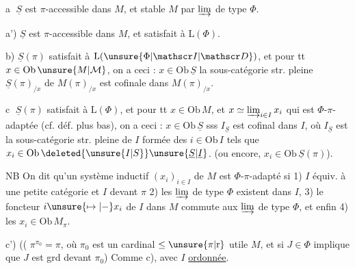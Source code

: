 \textcircled{a} $\underline S$ est $\pi$-accessible dans $M$, et stable  $M$ par $\varinjlim$ de type $\Phi$.

a') $\underline S$ est $\pi$-accessible dans $M$, et  satisfait à $\mathrm L(\Phi)$.



b) $\underline S(\pi)$ satisfait à $\mathrm L(\unsure{\Phi|\mathscr I|\mathscr D})$, et pour tt $x\in\mathrm{Ob}\,\unsure{M|\mathcal M}$, on a ceci : $x\in\mathrm{Ob}\,\underline S$  la sous-catégorie str. pleine $\underline S(\pi)_{/x}$ de $M(\pi)_{/x}$ est cofinale dans $M(\pi)_{/x}$.

\textcircled{c} $\underline S(\pi)$ satisfait à $\mathrm L(\Phi)$, et pour tt $x\in\mathrm{Ob}\,M$, et    $x\simeq\varinjlim_{i\in I}x_i$ qui est $\Phi$-$\pi$-adaptée (cf. déf. plus bas), on a ceci : $x\in\mathrm{Ob}\,\underline S$ sss $I_{\underline S}$ est cofinal dans $I$, où $I_{\underline S}$ est la sous-catégorie str. pleine de $I$ formée des $i\in\mathrm{Ob}\,I$ tels que $x_i\in\mathrm{Ob}\,\deleted{\unsure{I|S}}\unsure{\underline S|\underline I}$. (ou encore, $x_i\in\mathrm{Ob}\,\underline S(\pi)$).

NB On dit qu'un système inductif $(x_i)_{i\in I}$ de $M$ est $\Phi$-$\pi$-adapté si 1) $I$ équiv. à une petite catégorie et $I$  devant $\pi$ 2) les $\varinjlim$ de type $\Phi$ existent dans $I$, 3) le foncteur $i\unsure{\mapsto|-}x_i$ de $I$ dans $M$ commute aux $\varinjlim$ de type $\Phi$, et enfin 4) les $x_i\in\mathrm{Ob}\,M_\pi$.

c') (( $\pi^{\pi_0}=\pi$, où $\pi_0$ est un cardinal $\leq\unsure{\pi|\mathrm r}$ utile  $M$,  et si   $J\in\Phi$ implique que $J$ est grd devant $\pi_0$) Comme c), avec $I$ \uline{ordonnée}.



